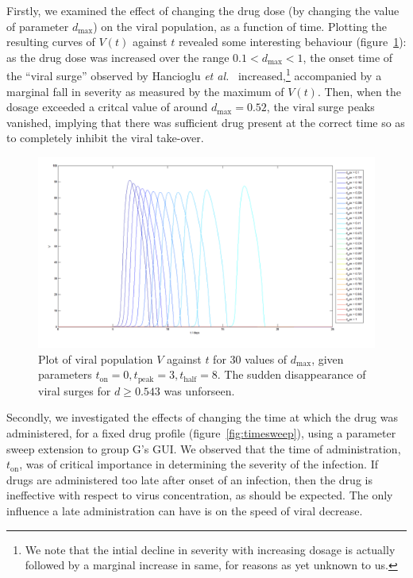 \documentclass[a4paper, 12pt]{report}
\begin{document}
Firstly, we examined the effect of changing the drug dose (by changing the value of parameter $d_{\textrm{max}}$) on the viral population, as a function of time. Plotting the resulting curves of $V(t)$ against $t$ revealed some interesting behaviour (figure~\ref{fig:dosesweep}): as the drug dose was increased over the range $0.1 < d_{\textrm{max}} < 1$, the onset time of the ``viral surge'' observed by Hancioglu \textit{et al.}~\cite{Hancioglu} increased,\footnote{We note that the intial decline in severity with increasing dosage is actually followed by a marginal increase in same, for reasons as yet unknown to us.} accompanied by a marginal fall in severity as measured by the maximum of $V(t)$. Then, when the dosage exceeded a critcal value of around  $d_{\textrm{max}} = 0.52$, the viral surge peaks vanished, implying that there was sufficient drug present at the correct time so as to completely inhibit the viral take-over.\\
\begin{figure}[h!]
\begin{centering}
\includegraphics[width = \textwidth]{dosesweep.png}
\caption{Plot of viral population $V$ against $t$ for 30 values of $d_{\textrm{max}}$, given parameters $t_{\textrm{on}} = 0, t_{\textrm{peak}} = 3, t_{\textrm{half}} = 8$. The sudden disappearance of viral surges for $d \geq 0.543$ was unforseen.}
\label{fig:dosesweep}
\end{centering}
\end{figure}

Secondly, we investigated the effects of changing the time at which the drug was administered, for a fixed drug profile (figure~\ref{fig:timesweep}), using a parameter sweep extension to group G's GUI. We observed that the time of administration, $t_{\textrm{on}}$, was of critical importance in determining the severity of the infection. If drugs are administered too late after onset of an infection, then the drug is ineffective with respect to virus concentration, as should be expected. The only influence a late administration can have is on the speed of viral decrease.
\end{document}
